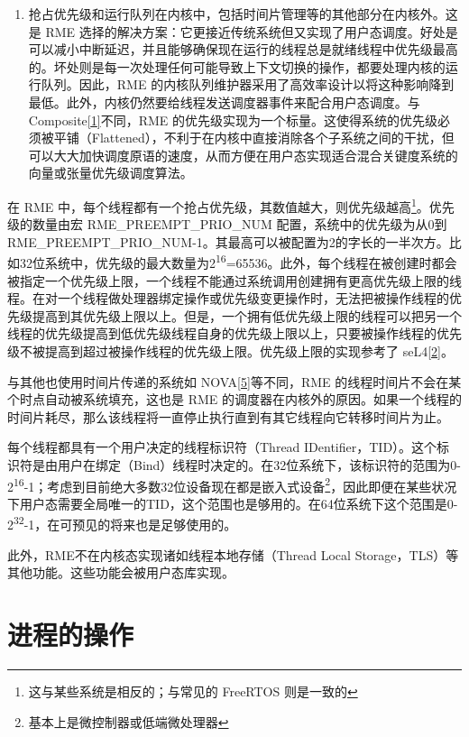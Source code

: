\begin{enumerate}
\item
  抢占优先级和运行队列在内核中，包括时间片管理等的其他部分在内核外。这是 RME 选择的解决方案：它更接近传统系统但又实现了用户态调度。好处是可以减小中断延迟，并且能够确保现在运行的线程总是就绪线程中优先级最高的。坏处则是每一次处理任何可能导致上下文切换的操作，都要处理内核的运行队列。因此，RME 的内核队列维护器采用了高效率设计以将这种影响降到最低。此外，内核仍然要给线程发送调度器事件来配合用户态调度。与Composite\hyperref[cite:4-1]{{[}1{]}}不同，RME 的优先级实现为一个标量。这使得系统的优先级必须被平铺（Flattened），不利于在内核中直接消除各个子系统之间的干扰，但可以大大加快调度原语的速度，从而方便在用户态实现适合混合关键度系统的向量或张量优先级调度算法。
\end{enumerate}

在 RME 中，每个线程都有一个抢占优先级，其数值越大，则优先级越高\footnote{这与某些系统是相反的；与常见的 FreeRTOS 则是一致的}。优先级的数量由宏 RME\_PREEMPT\_PRIO\_NUM 配置，系统中的优先级为从0到
RME\_PREEMPT\_PRIO\_NUM-1。其最高可以被配置为2的字长的一半次方。比如32位系统中，优先级的最大数量为2\textsuperscript{16}=65536。此外，每个线程在被创建时都会被指定一个优先级上限，一个线程不能通过系统调用创建拥有更高优先级上限的线程。在对一个线程做处理器绑定操作或优先级变更操作时，无法把被操作线程的优先级提高到其优先级上限以上。但是，一个拥有低优先级上限的线程可以把另一个线程的优先级提高到低优先级线程自身的优先级上限以上，只要被操作线程的优先级不被提高到超过被操作线程的优先级上限。优先级上限的实现参考了 seL4\hyperref[cite:4-2]{{[}2{]}}。

与其他也使用时间片传递的系统如 NOVA\hyperref[cite:4-5]{{[}5{]}}等不同，RME 的线程时间片不会在某个时点自动被系统填充，这也是 RME 的调度器在内核外的原因。如果一个线程的时间片耗尽，那么该线程将一直停止执行直到有其它线程向它转移时间片为止。

每个线程都具有一个用户决定的线程标识符（Thread
IDentifier，TID）。这个标识符是由用户在绑定（Bind）线程时决定的。在32位系统下，该标识符的范围为0-2\textsuperscript{16}-1；考虑到目前绝大多数32位设备现在都是嵌入式设备\footnote{基本上是微控制器或低端微处理器}，因此即便在某些状况下用户态需要全局唯一的TID，这个范围也是够用的。在64位系统下这个范围是0-2\textsuperscript{32}-1，在可预见的将来也是足够使用的。

此外，RME不在内核态实现诸如线程本地存储（Thread Local
Storage，TLS）等其他功能。这些功能会被用户态库实现。

\section{进程的操作}\label{sec:4-process-operations}

